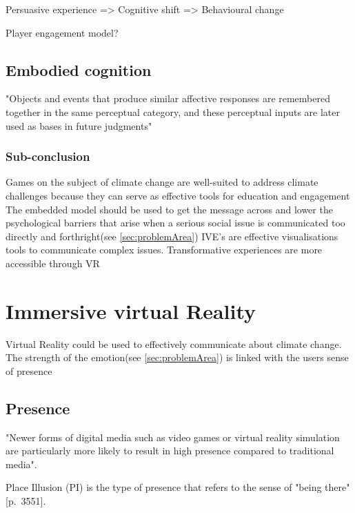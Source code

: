     
    Persuasive experience => Cognitive shift => Behavioural change
    \cite{transformativeVR}
    \cite{vrCapabilitiesSlater}
    
    
    
    Player engagement model?\cite{playerEngagement}
    
    
    
    \subsection{Embodied cognition}
    "Objects and events that produce similar affective responses are remembered together in the same perceptual category, and these perceptual inputs are later used as bases in future judgments"\cite{ahn2011embodied}
    
    
    
    \subsubsection{Sub-conclusion}
    Games on the subject of climate change are well-suited to address climate challenges because they can serve as effective tools for education and engagement\cite{gamesAsToolsForEngagement}
    The embedded model should be used to get the message across and lower the psychological barriers that arise when a serious social issue is communicated too directly and forthright(see \autoref{sec:problemArea})
    IVE's are effective visualisations tools to communicate complex issues.
    Transformative experiences are more accessible through VR


\section{Immersive virtual Reality}
    Virtual Reality could be used to effectively communicate about climate change. 
    The strength of the emotion(see \autoref{sec:problemArea}) is linked with the users sense of presence\cite{vrEngagementClimateChange}
    
    \subsection{Presence}
    "Newer forms of digital media such as video games or virtual reality simulation are particularly more likely to result in high presence compared to traditional media"\cite{ahn2011embodied}.
    
    Place Illusion (PI) is the type of presence that refers to the sense of "being there"\citep{vrImmersion}[p.~3551].
    
